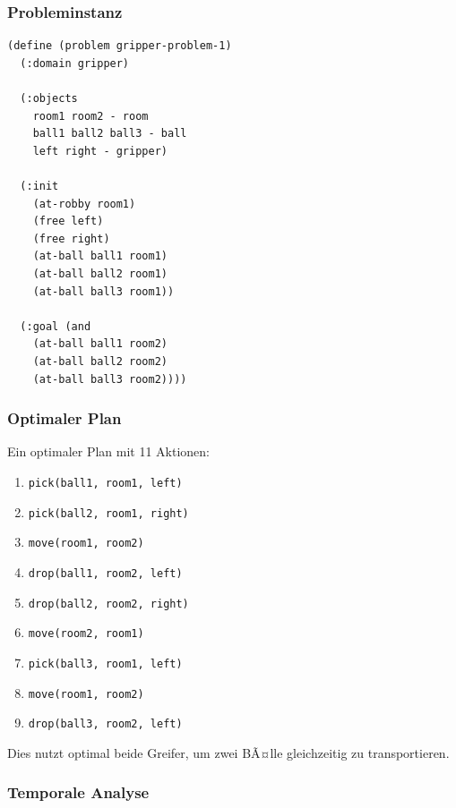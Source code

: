 ﻿\documentclass[a4paper,12pt]{article}
\theoremstyle{definition}
\begin{document}
\subsubsection{Probleminstanz}

\begin{lstlisting}[language=PDDL, caption=Gripper Problem]
(define (problem gripper-problem-1)
  (:domain gripper)
  
  (:objects
    room1 room2 - room
    ball1 ball2 ball3 - ball
    left right - gripper)
  
  (:init
    (at-robby room1)
    (free left)
    (free right)
    (at-ball ball1 room1)
    (at-ball ball2 room1)
    (at-ball ball3 room1))
  
  (:goal (and
    (at-ball ball1 room2)
    (at-ball ball2 room2)
    (at-ball ball3 room2))))
\end{lstlisting}

\subsubsection{Optimaler Plan}

Ein optimaler Plan mit 11 Aktionen:

\begin{enumerate}
	\item \texttt{pick(ball1, room1, left)}
	\item \texttt{pick(ball2, room1, right)}
	\item \texttt{move(room1, room2)}
	\item \texttt{drop(ball1, room2, left)}
	\item \texttt{drop(ball2, room2, right)}
	\item \texttt{move(room2, room1)}
	\item \texttt{pick(ball3, room1, left)}
	\item \texttt{move(room1, room2)}
	\item \texttt{drop(ball3, room2, left)}
\end{enumerate}

Dies nutzt optimal beide Greifer, um zwei BÃ¤lle gleichzeitig zu transportieren.

\subsubsection{Temporale Analyse}
\end{document}
